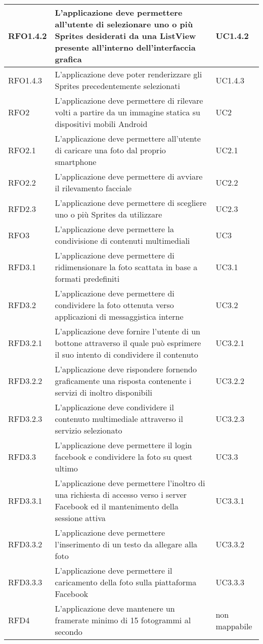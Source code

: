 \begin{center}
\begin{longtable}{ | p{2cm} | p{7cm} | p{2cm} |}
    RFO1.4.2 &  L'applicazione deve permettere all'utente di selezionare uno o più Sprites desiderati da una ListView presente all'interno dell'interfaccia grafica  & UC1.4.2  \\ \hline
    RFO1.4.3 &  L'applicazione deve poter renderizzare gli Sprites precedentemente selezionati & UC1.4.3  \\ \hline    
    RFO2 &  L'applicazione deve permettere di rilevare volti a partire da un immagine statica su dispositivi mobili Android & UC2  \\ \hline
    RFO2.1 &  L'applicazione deve permettere all'utente di caricare una foto dal proprio smartphone & UC2.1  \\ \hline 
    RFO2.2 &  L'applicazione deve permettere di avviare il rilevamento facciale & UC2.2 \\ \hline
    RFD2.3 &   L'applicazione deve permettere di scegliere uno o più Sprites da utilizzare  & UC2.3  \\ \hline 
    RFO3 &  L'applicazione deve permettere la condivisione di contenuti multimediali & UC3 \\ \hline
    RFD3.1 &  L'applicazione deve permettere di ridimensionare la foto scattata in base a formati predefiniti & UC3.1 \\ \hline
    RFD3.2 &  L'applicazione deve permettere di condividere la foto ottenuta verso applicazioni di messaggistica interne  & UC3.2 \\ \hline
    RFD3.2.1 &  L'applicazione deve fornire l'utente di un bottone attraverso il quale può esprimere il suo intento di condividere il contenuto  & UC3.2.1 \\ \hline
    RFD3.2.2 &  L'applicazione deve rispondere fornendo graficamente una risposta contenente i servizi di inoltro disponibili  & UC3.2.2 \\ \hline
    RFD3.2.3 &  L'applicazione deve condividere il contenuto multimediale attraverso il servizio selezionato  & UC3.2.3 \\ \hline    
    RFD3.3 &  L'applicazione deve permettere il login facebook e condividere la foto su quest ultimo  & UC3.3 \\ \hline
    RFD3.3.1 &  L'applicazione deve permettere l'inoltro di una richiesta di accesso verso i server Facebook ed il mantenimento della sessione attiva & UC3.3.1 \\ \hline
    RFD3.3.2 &  L'applicazione deve permettere l'inserimento di un testo da allegare alla foto & UC3.3.2 \\ \hline
    RFD3.3.3 &  L'applicazione deve permettere il caricamento della foto sulla piattaforma Facebook & UC3.3.3 \\ \hline
    RFD4 &  L'applicazione deve mantenere un framerate minimo di 15 fotogrammi al secondo & non mappabile \\ \hline
    \end{longtable}
    

\end{center}

